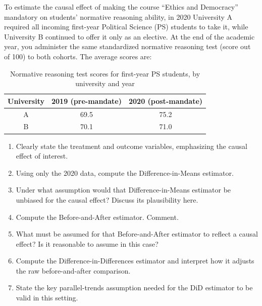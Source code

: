 \documentclass[11pt]{exam}
\begin{document}
\begin{questions}
\question[3.5]
To estimate the causal effect of making the course “Ethics and Democracy” mandatory on students’ normative reasoning ability, in 2020 University A required all incoming first-year Political Science (PS) students to take it, while University B continued to offer it only as an elective. At the end of the academic year, you administer the same standardized normative reasoning test (score out of 100) to both cohorts. The average scores are:

\begin{table}[ht]
    \centering
    \caption{Normative reasoning test scores for first-year PS students, by university and year}
    \label{tab:ethics_scores}
    \begin{tabular}{ccc}
        \toprule
        \textbf{University} & \textbf{2019 (pre-mandate)} & \textbf{2020 (post-mandate)} \\
        \midrule
        A & 69.5 & 75.2 \\
        B & 70.1 & 71.0 \\
        \bottomrule
    \end{tabular}
\end{table}

\begin{enumerate}[label=(\alph*)]
    \item Clearly state the treatment and outcome variables, emphasizing the causal effect of interest.
    \item Using only the 2020 data, compute the Difference-in-Means estimator.
    \item Under what assumption would that Difference-in-Means estimator be unbiased for the causal effect? Discuss its plausibility here.
    \item Compute the Before-and-After estimator. Comment.
    \item What must be assumed for that Before-and-After estimator to reflect a causal effect? Is it reasonable to assume in this case?
    \item Compute the Difference-in-Differences estimator and interpret how it adjusts the raw before-and-after comparison.
    \item State the key parallel-trends assumption needed for the DiD estimator to be valid in this setting.
\end{enumerate}


\end{questions}
\end{document}
